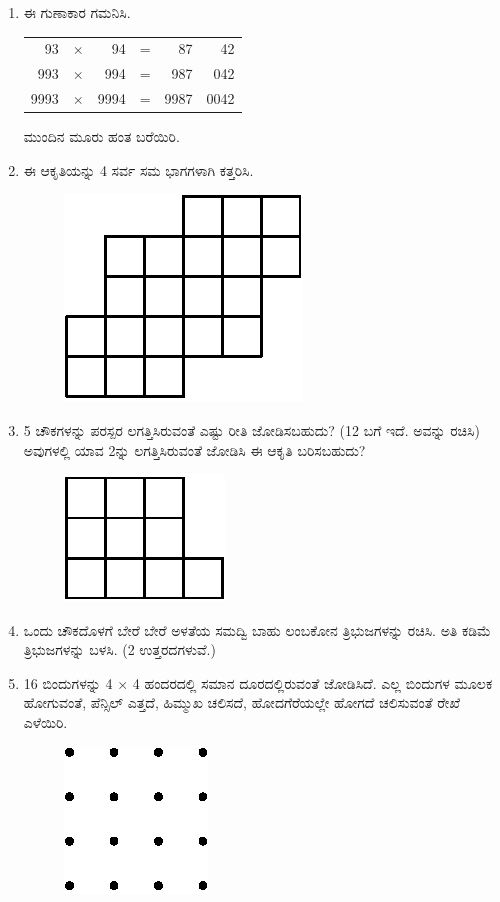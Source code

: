 \begin{enumerate}
\item ಈ ಗುಣಾಕಾರ ಗಮನಿಸಿ. 

\begin{tabular}[t]{rcrcrr}
93 & $\times$ & 94 & = & 87 & 42\\
993 & $\times$ & 994 & = & 987 & 042\\
9993 & $\times$ & 9994 & = & 9987 & 0042\\
\end{tabular}

ಮುಂದಿನ ಮೂರು ಹಂತ ಬರೆಯಿರಿ. 

\item ಈ ಆಕೃತಿಯನ್ನು 4 ಸರ್ವ ಸಮ ಭಾಗಗಳಾಗಿ ಕತ್ತರಿಸಿ. 
\begin{figure}[H]
\centering
\includegraphics{images/chap11/q14.eps}
\end{figure}

\item 5 ಚೌಕಗಳನ್ನು ಪರಸ್ಪರ ಲಗತ್ತಿಸಿರುವಂತೆ ಎಷ್ಟು ರೀತಿ ಜೋಡಿಸಬಹುದು? (12 ಬಗೆ ಇದೆ. ಅವನ್ನು ರಚಿಸಿ) ಅವುಗಳಲ್ಲಿ ಯಾವ 2ನ್ನು ಲಗತ್ತಿಸಿರುವಂತೆ ಜೋಡಿಸಿ ಈ ಆಕೃತಿ ಬರಿಸಬಹುದು? 
\begin{figure}[H]
\centering
\includegraphics{images/chap11/q15.eps}
\end{figure}

\item ಒಂದು ಚೌಕದೊಳಗೆ ಬೇರೆ ಬೇರೆ ಅಳತೆಯ ಸಮದ್ವಿ ಬಾಹು ಲಂಬಕೋನ ತ್ರಿಭುಜಗಳನ್ನು ರಚಿಸಿ. ಅತಿ ಕಡಿಮೆ ತ್ರಿಭುಜಗಳನ್ನು ಬಳಸಿ. (2 ಉತ್ತರದಗಳುವೆ.)

\item 16 ಬಿಂದುಗಳನ್ನು 4 $\times$ 4 ಹಂದರದಲ್ಲಿ ಸಮಾನ ದೂರದಲ್ಲಿರುವಂತೆ ಜೋಡಿಸಿದೆ. ಎಲ್ಲ ಬಿಂದುಗಳ ಮೂಲಕ ಹೋಗುವಂತೆ, ಪೆನ್ಸಿಲ್ ಎತ್ತದೆ, ಹಿಮ್ಮುಖ ಚಲಿಸದೆ, ಹೋದಗೆರೆಯಲ್ಲೇ ಹೋಗದೆ ಚಲಿಸುವಂತೆ ರೇಖೆ ಎಳೆಯಿರಿ. 
\begin{figure}[H]
\centering
\includegraphics{images/chap11/q17.eps}
\end{figure}



\end{enumerate}
